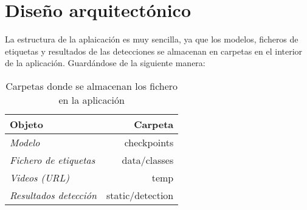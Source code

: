 \clearpage

\section{Diseño arquitectónico}
La estructura de la aplaicación es muy sencilla, ya que los modelos, ficheros de etiquetas y resultados de las detecciones se almacenan en carpetas en el interior de la aplicación.
Guardándose de la siguiente manera:
\begin{table}[H]
    \centering
    \begin{tabular}{lr}
        \toprule
        \textbf{Objeto} & \textbf{Carpeta}\\
        \midrule
        \textit{Modelo} & checkpoints \\
        \textit{Fichero de etiquetas} & data\//classes \\
        \textit{Videos (URL)} & temp \\
        \textit{Resultados detección} & static\//detection \\
        \bottomrule
    \end{tabular}
    \caption{Carpetas donde se almacenan los fichero en la aplicación}
\end{table}